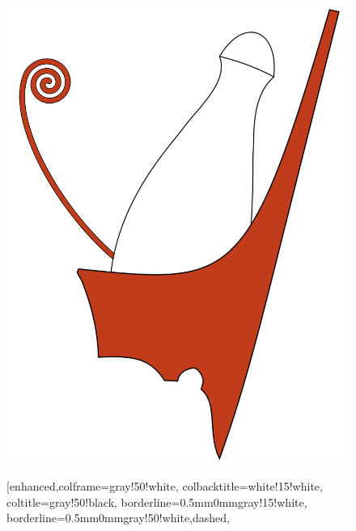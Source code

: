 \begin{figure}[H]
	\centering
	\begin{minipage}{0.44\textwidth}
		\begin{tcolorbox}[enhanced,colframe=gray!50!white,
			colbacktitle=white!15!white,
			coltitle=gray!50!black,
			borderline={0.5mm}{0mm}{gray!15!white},
			borderline={0.5mm}{0mm}{gray!50!white,dashed},
			attach boxed title to top center={yshift=-2mm},
			boxed title style={boxrule=0.4pt},
			title=Kettős korona]{
				\includegraphics[width=1.0\linewidth]{images/01/kettos_korona}}
		\end{tcolorbox}
	\end{minipage}
	\hfill
	\begin{minipage}{0.44\textwidth}
		\begin{tcolorbox}[enhanced,colframe=gray!50!white,
			colbacktitle=white!15!white,
			coltitle=gray!50!black,
			borderline={0.5mm}{0mm}{gray!15!white},
			borderline={0.5mm}{0mm}{gray!50!white,dashed},

\end{tcolorbox}
\end{minipage}
\end{figure}
